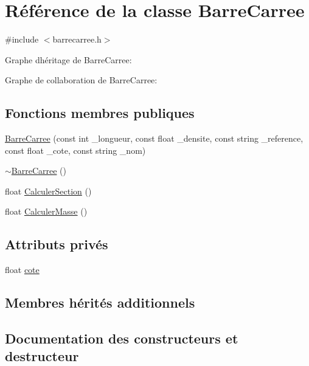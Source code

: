 \hypertarget{class_barre_carree}{}\section{Référence de la classe Barre\+Carree}
\label{class_barre_carree}


{\ttfamily \#include $<$barrecarree.\+h$>$}



Graphe d\textquotesingle{}héritage de Barre\+Carree\+:


Graphe de collaboration de Barre\+Carree\+:
\subsection*{Fonctions membres publiques}
\begin{DoxyCompactItemize}
\item 
\hyperlink{class_barre_carree_a9f80fe7f0abbbfe063a7d23a87f2dc22}{Barre\+Carree} (const int \+\_\+longueur, const float \+\_\+densite, const string \+\_\+reference, const float \+\_\+cote, const string \+\_\+nom)
\item 
\hyperlink{class_barre_carree_adc7972248e876187bc99b921079eb280}{$\sim$\+Barre\+Carree} ()
\item 
float \hyperlink{class_barre_carree_a2ae3a05c5e05ea41a775060b83e9a9f6}{Calculer\+Section} ()
\item 
float \hyperlink{class_barre_carree_a8dc111b64759b1df3630fc158ff4efb5}{Calculer\+Masse} ()
\end{DoxyCompactItemize}
\subsection*{Attributs privés}
\begin{DoxyCompactItemize}
\item 
float \hyperlink{class_barre_carree_adb083da7f685ddf27bbfe006f09f108b}{cote}
\end{DoxyCompactItemize}
\subsection*{Membres hérités additionnels}


\subsection{Documentation des constructeurs et destructeur}
\mbox{\label{class_barre_carree_a9f80fe7f0abbbfe063a7d23a87f2dc22}} 
